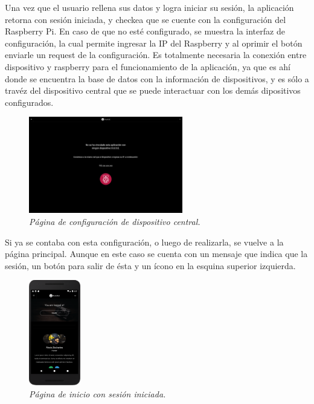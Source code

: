 Una vez que el usuario rellena sus datos y logra iniciar su sesión, la aplicación retorna con sesión iniciada, y checkea que se cuente con la configuración del Raspberry Pi.
En caso de que no esté configurado, se muestra la interfaz de configuración, la cual permite ingresar la IP del Raspberry y al oprimir el botón enviarle un request de la configuración. Es totalmente necesaria la conexión entre dispositivo y raspberry para el funcionamiento de la aplicación, ya que es ahí donde se encuentra la base de datos con la información de dispositivos, y es sólo a travéz del dispositivo central que se puede interactuar con los demás dipositivos configurados.

\begin{figure}[H]
  \centering
  \includegraphics[width=0.6\textwidth, keepaspectratio]{images/app-web-get-raspberry-configuration}
  \caption{\textit{Página de configuración de dispositivo central.}}
  \label{fig:app-web-get-raspberry-configuration}
\end{figure}

Si ya se contaba con esta configuración, o luego de realizarla, se vuelve a la página principal. Aunque en este caso se cuenta con un mensaje que indica que la sesión, un botón para salir de ésta y un ícono en la esquina superior izquierda.

\begin{figure}[H]
  \centering
  \includegraphics[width=0.2\textwidth, keepaspectratio]{images/app-movil-login-success}
  \caption{\textit{Página de inicio con sesión iniciada.}}
  \label{fig:app-movil-login-success}
\end{figure}

